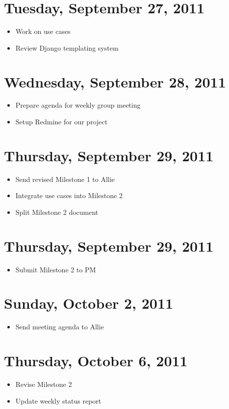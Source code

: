 \documentclass{article}
\begin{document}
\section{Tuesday, September 27, 2011}
\begin{itemize}
\item Work on use cases
\item Review Django templating system
\end{itemize}

\section{Wednesday, September 28, 2011}
\begin{itemize}
\item Prepare agenda for weekly group meeting
\item Setup Redmine for our project
\end{itemize}

\section{Thursday, September 29, 2011}
\begin{itemize}
\item Send revised Milestone 1 to Allie
\item Integrate use cases into Milestone 2
\item Split Milestone 2 document
\end{itemize}

\section{Thursday, September 29, 2011}
\begin{itemize}
\item Submit Milestone 2 to PM
\end{itemize}

\section{Sunday, October 2, 2011}
\begin{itemize}
\item Send meeting agenda to Allie
\end{itemize}

\section{Thursday, October 6, 2011}
\begin{itemize}
\item Revise Milestone 2
\item Update weekly status report
\end{itemize}
\end{document}
